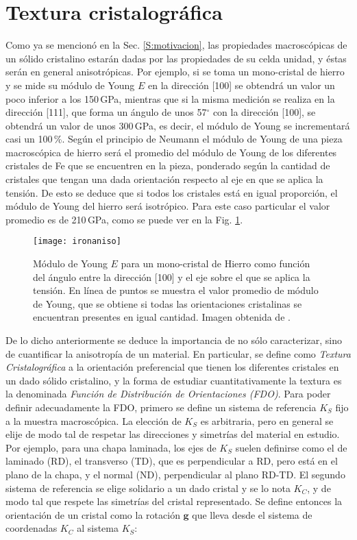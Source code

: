 \section{Textura cristalográfica}\label{S:Text}
Como ya se mencionó en la Sec. \ref{S:motivacion}, las propiedades macroscópicas de un sólido cristalino estarán dadas por las propiedades de su celda unidad, y éstas serán en general anisotrópicas.
Por ejemplo, si se toma un mono-cristal de hierro y se mide su módulo de Young $E$ en la dirección [100] se obtendrá un valor un poco inferior a los 150\,GPa, mientras que si la misma medición se realiza en la dirección [111], que forma un ángulo de unos 57$^{\circ}$ con la dirección [100], se obtendrá un valor de unos 300\,GPa, es decir, el módulo de Young se incrementará casi un 100\,\%.
Según el principio de Neumann\cite{nye1985physical} el módulo de Young de una pieza macroscópica de hierro será el promedio del módulo de Young de los diferentes cristales de Fe que se encuentren en la pieza, ponderado según la cantidad de cristales que tengan una dada orientación respecto al eje en que se aplica la tensión.
De esto se deduce que si todos los cristales está en igual proporción, el módulo de Young del hierro será isotrópico.
Para este caso particular el valor promedio es de 210\,GPa, como se puede ver en la Fig. \ref{fig:ironaniso}.

\begin{figure}[!htb]
  \centering
  \texttt{[image: ironaniso]}
  \caption{Módulo de Young $E$ para un mono-cristal de Hierro como función del ángulo entre la dirección [100] y el eje sobre el que se aplica la tensión. En línea de puntos se muestra el valor promedio de módulo de Young, que se obtiene si todas las orientaciones cristalinas se encuentran presentes en igual cantidad. Imagen obtenida de \cite{randle2000introduction}.}
  \label{fig:ironaniso}
\end{figure}

De lo dicho anteriormente se deduce la importancia de no sólo caracterizar, sino de cuantificar la anisotropía de un material. 
En particular, se define como \textit{Textura Cristalográfica} a la orientación preferencial que tienen los diferentes cristales en un dado sólido cristalino, y la forma de estudiar cuantitativamente la textura es la denominada \textit{Función de Distribución de Orientaciones (FDO)}.
Para poder definir adecuadamente la FDO, primero se define un sistema de referencia $K_S$ fijo a la muestra macroscópica.
La elección de $K_S$ es arbitraria, pero en general se elije de modo tal de respetar las direcciones y simetrías del material en estudio. 
Por ejemplo, para una chapa laminada, los ejes de $K_S$ suelen definirse como el de laminado (RD), el transverso (TD), que es perpendicular a RD, pero está en el plano de la chapa, y el normal (ND), perpendicular al plano RD-TD.
El segundo sistema de referencia se elige solidario a un dado cristal y se lo nota $K_C$, y de modo tal que respete las simetrías del cristal representado.
Se define entonces la orientación de un cristal como la rotación $\mathbf{g}$ que lleva desde el sistema de coordenadas $K_C$ al sistema $K_S$:


